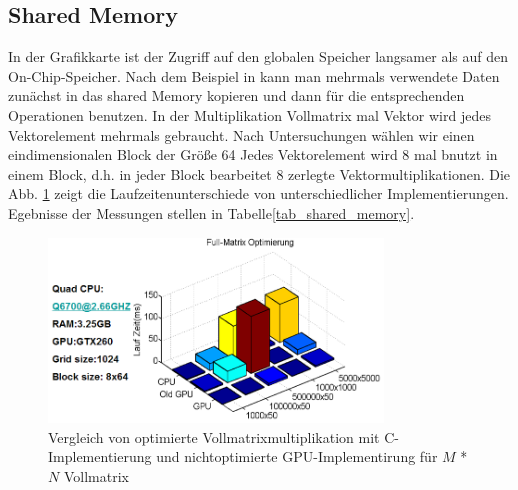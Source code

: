 \subsection{Shared Memory}
In der Grafikkarte ist der Zugriff auf den globalen Speicher langsamer als auf den On-Chip-Speicher.  Nach dem Beispiel in \cite{cudapg}  kann man mehrmals verwendete Daten zunächst in das shared Memory kopieren und dann für die entsprechenden Operationen benutzen.
In der Multiplikation Vollmatrix mal Vektor wird jedes Vektorelement mehrmals gebraucht.
Nach Untersuchungen wählen wir einen eindimensionalen Block der Größe 64
Jedes Vektorelement wird 8 mal bnutzt in einem Block, d.h. in jeder Block bearbeitet
8 zerlegte Vektormultiplikationen. Die Abb. \ref{sharememory}
zeigt die Laufzeitenunterschiede von unterschiedlicher Implementierungen.
Egebnisse der Messungen stellen in Tabelle\ref{tab_shared_memory}.
\begin{figure}[htbp]
\includegraphics[width=3.5in]{../xby/pic/sharememory_2}
\caption{Vergleich von optimierte Vollmatrixmultiplikation mit C-Implementierung und nichtoptimierte GPU-Implementirung für $M$ * $N$ Vollmatrix}
\label{sharememory}
\end{figure}


